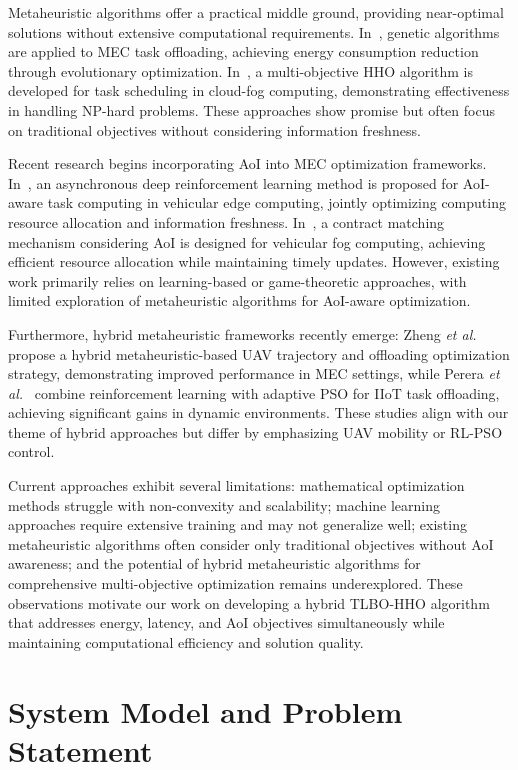 \documentclass[conference]{IEEEtran}
\begin{document}
Metaheuristic algorithms offer a practical middle ground, providing near-optimal solutions without extensive computational requirements. In~\cite{li2020genetic}, genetic algorithms are applied to MEC task offloading, achieving energy consumption reduction through evolutionary optimization. In~\cite{ali2024multiobjective}, a multi-objective HHO algorithm is developed for task scheduling in cloud-fog computing, demonstrating effectiveness in handling NP-hard problems. These approaches show promise but often focus on traditional objectives without considering information freshness.

Recent research begins incorporating AoI into MEC optimization frameworks. In~\cite{liu2023asynchronous}, an asynchronous deep reinforcement learning method is proposed for AoI-aware task computing in vehicular edge computing, jointly optimizing computing resource allocation and information freshness. In~\cite{zhou2019computation}, a contract matching mechanism considering AoI is designed for vehicular fog computing, achieving efficient resource allocation while maintaining timely updates. However, existing work primarily relies on learning-based or game-theoretic approaches, with limited exploration of metaheuristic algorithms for AoI-aware optimization.

Furthermore, hybrid metaheuristic frameworks recently emerge: Zheng \textit{et al.}~\cite{Zheng_2025} propose a hybrid metaheuristic-based UAV trajectory and offloading optimization strategy, demonstrating improved performance in MEC settings, while Perera \textit{et al.}~\cite{Perera_2025} combine reinforcement learning with adaptive PSO for IIoT task offloading, achieving significant gains in dynamic environments. These studies align with our theme of hybrid approaches but differ by emphasizing UAV mobility or RL-PSO control.

Current approaches exhibit several limitations: mathematical optimization methods struggle with non-convexity and scalability; machine learning approaches require extensive training and may not generalize well; existing metaheuristic algorithms often consider only traditional objectives without AoI awareness; and the potential of hybrid metaheuristic algorithms for comprehensive multi-objective optimization remains underexplored. These observations motivate our work on developing a hybrid TLBO-HHO algorithm that addresses energy, latency, and AoI objectives simultaneously while maintaining computational efficiency and solution quality.

\section{System Model and Problem Statement}
\end{document}
